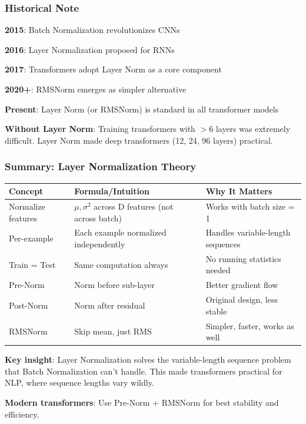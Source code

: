 \documentclass[11pt,oneside]{book}
\begin{document}
\subsubsection{Historical Note}

\textbf{2015}: Batch Normalization revolutionizes CNNs

\textbf{2016}: Layer Normalization proposed for RNNs

\textbf{2017}: Transformers adopt Layer Norm as a core component

\textbf{2020+}: RMSNorm emerges as simpler alternative

\textbf{Present}: Layer Norm (or RMSNorm) is standard in all transformer models

\textbf{Without Layer Norm}: Training transformers with $>6$ layers was extremely difficult. Layer Norm made deep transformers (12, 24, 96 layers) practical.

\subsubsection{Summary: Layer Normalization Theory}

\begin{center}
\begin{tabular}{lll}
\hline
\textbf{Concept} & \textbf{Formula/Intuition} & \textbf{Why It Matters} \\
\hline
Normalize features & $\mu, \sigma^2$ across D features (not across batch) & Works with batch size = 1 \\
Per-example & Each example normalized independently & Handles variable-length sequences \\
Train = Test & Same computation always & No running statistics needed \\
Pre-Norm & Norm before sub-layer & Better gradient flow \\
Post-Norm & Norm after residual & Original design, less stable \\
RMSNorm & Skip mean, just RMS & Simpler, faster, works as well \\
\hline
\end{tabular}
\end{center}

\textbf{Key insight}: Layer Normalization solves the variable-length sequence problem that Batch Normalization can't handle. This made transformers practical for NLP, where sequence lengths vary wildly.

\textbf{Modern transformers}: Use Pre-Norm + RMSNorm for best stability and efficiency.
\end{document}
